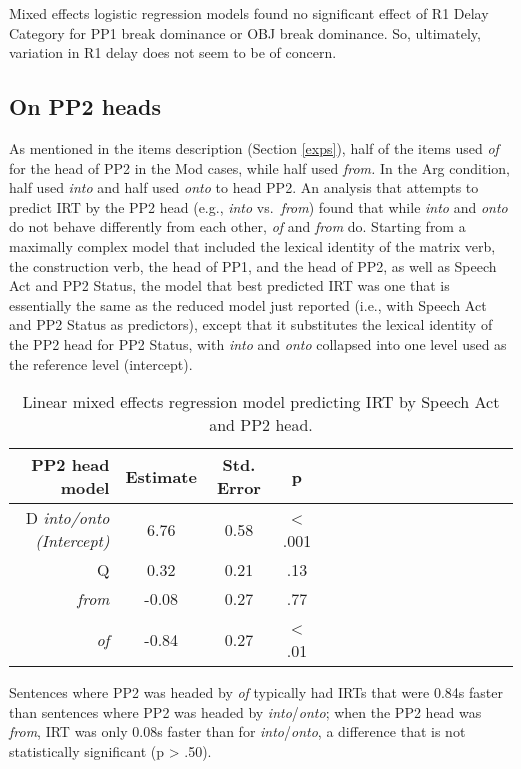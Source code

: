 \documentclass[11pt,oneside]{book}
\begin{document}
Mixed effects logistic regression models found no significant effect of R1 Delay Category for PP1 break dominance or OBJ break dominance. So, ultimately, variation in R1 delay does not seem to be of concern.

\hypertarget{pp2h}{%
\subsection{On PP2 heads}\label{pp2h}}

As mentioned in the items description (Section \ref{exps}), half of the items used \emph{of} for the head of PP2 in the Mod cases, while half used \emph{from.} In the Arg condition, half used \emph{into} and half used \emph{onto} to head PP2. An analysis that attempts to predict IRT by the PP2 head (e.g., \emph{into} vs.~\emph{from}) found that while \emph{into} and \emph{onto} do not behave differently from each other, \emph{of} and \emph{from} do. Starting from a maximally complex model that included the lexical identity of the matrix verb, the construction verb, the head of PP1, and the head of PP2, as well as Speech Act and PP2 Status, the model that best predicted IRT was one that is essentially the same as the reduced model just reported (i.e., with Speech Act and PP2 Status as predictors), except that it substitutes the lexical identity of the PP2 head for PP2 Status, with \emph{into} and \emph{onto} collapsed into one level used as the reference level (intercept).

\begin{table}[!h]

\caption{\label{tab:pp2hd}Linear mixed effects regression model predicting IRT by Speech Act and PP2 head.}
\centering
\begin{tabular}{rcccrcccrcccrccc}
\toprule
PP2 head model & Estimate & Std. Error & p\\
\midrule
D \em{into/onto} (Intercept) & 6.76 & 0.58 & < .001\\
Q & 0.32 & 0.21 & .13\\
\em{from} & -0.08 & 0.27 & .77\\
\em{of} & -0.84 & 0.27 & < .01\\
\bottomrule
\end{tabular}
\end{table}

Sentences where PP2 was headed by \emph{of} typically had IRTs that were 0.84s faster than sentences where PP2 was headed by \emph{into}/\emph{onto}; when the PP2 head was \emph{from}, IRT was only 0.08s faster than for \emph{into}/\emph{onto}, a difference that is not statistically significant (p \textgreater{} .50).
\end{document}
